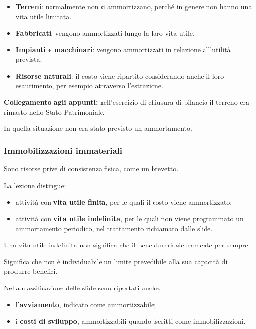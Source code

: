 \begin{itemize}
    \item \textbf{Terreni}:
    normalmente non si ammortizzano,
    perché in genere non hanno
    una vita utile limitata.

    \item \textbf{Fabbricati}:
    vengono ammortizzati
    lungo la loro vita utile.

    \item \textbf{Impianti e macchinari}:
    vengono ammortizzati
    in relazione all'utilità prevista.

    \item \textbf{Risorse naturali}:
    il costo viene ripartito
    considerando anche il loro esaurimento,
    per esempio attraverso l'estrazione.
\end{itemize}

\noindent \textbf{Collegamento agli appunti:}
nell'esercizio di chiusura di bilancio
il terreno era rimasto
nello Stato Patrimoniale.

\noindent In quella situazione
non era stato previsto un ammortamento.


\subsubsection*{Immobilizzazioni immateriali}

\noindent Sono risorse prive
di consistenza fisica,
come un brevetto.

\noindent La lezione distingue:

\begin{itemize}
    \item attività con \textbf{vita utile finita},
    per le quali il costo viene ammortizzato;

    \item attività con \textbf{vita utile indefinita},
    per le quali non viene programmato
    un ammortamento periodico,
    nel trattamento richiamato dalle slide.
\end{itemize}

\noindent Una vita utile indefinita
non significa che il bene
durerà sicuramente per sempre.

\noindent Significa che non è individuabile
un limite prevedibile
alla sua capacità di produrre benefici.

\medskip

\noindent Nella classificazione delle slide
sono riportati anche:

\begin{itemize}
    \item l'\textbf{avviamento},
    indicato come ammortizzabile;

    \item i \textbf{costi di sviluppo},
    ammortizzabili quando iscritti
    come immobilizzazioni.
\end{itemize}

